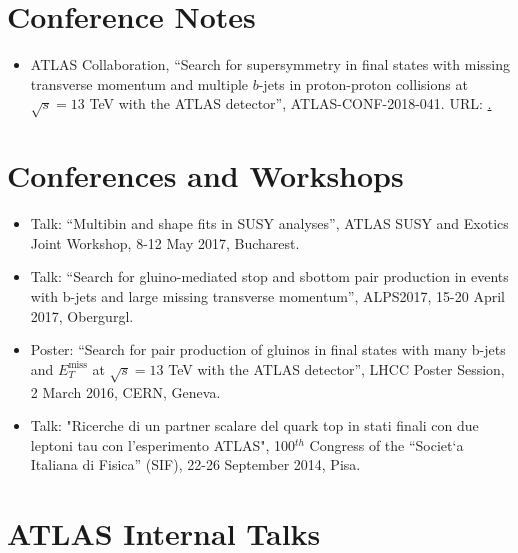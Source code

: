 \documentclass[11pt,a4paper]{moderncv}
\begin{document}
\section{Conference Notes}
\begin{itemize}
\item  ATLAS Collaboration, ``Search for supersymmetry in final states with missing transverse momentum and multiple $b$-jets in proton-proton collisions at $\sqrt{s} = 13$ TeV with the ATLAS detector'', ATLAS-CONF-2018-041. URL: \href{}.
\end{itemize}


\section{Conferences and Workshops}
\begin{itemize}
\item Talk: “Multibin and shape fits in SUSY analyses”, ATLAS SUSY and Exotics Joint Workshop, 8-12 May 2017, Bucharest.
\item Talk: “Search for gluino-mediated stop and sbottom pair production in events with b-jets and large missing transverse momentum”, ALPS2017, 15-20 April 2017, Obergurgl.
\item Poster: “Search for pair production of gluinos in final states with many b-jets and $E_T^{\mathrm{miss}}$ at $\sqrt{s}=13$ TeV with the ATLAS detector”, LHCC Poster Session, 2 March 2016, CERN, Geneva.
\item Talk: "Ricerche di un partner scalare del quark top in stati finali con due leptoni tau con l'esperimento ATLAS", 100$^{th}$ Congress of the “Societ`a Italiana di Fisica” (SIF), 22-26 September 2014, Pisa.
\end{itemize}

\iffalse
\section{ATLAS Internal Talks}


\end{document}
